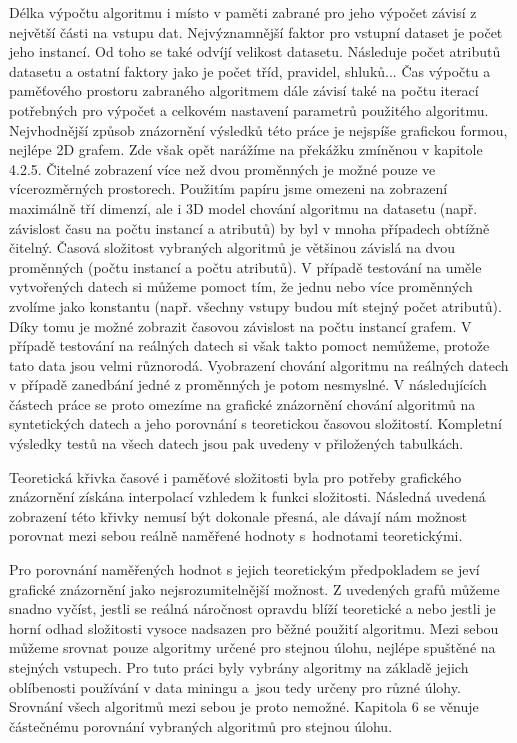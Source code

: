 \documentclass[12pt]{article}
\begin{document}
Délka výpočtu algoritmu i místo v paměti zabrané pro jeho výpočet závisí z největší části na vstupu dat. Nejvýznamnější faktor pro vstupní dataset je počet jeho instancí. Od toho se také odvíjí velikost datasetu. Následuje počet atributů datasetu a ostatní faktory jako je počet tříd, pravidel, shluků... Čas výpočtu a paměťového prostoru zabraného algoritmem dále závisí také na počtu iterací potřebných pro výpočet a celkovém nastavení parametrů použitého algoritmu.
\newline
\indent
Nejvhodnější způsob znázornění výsledků této práce je nejspíše grafickou formou, nejlépe 2D grafem. Zde však opět narážíme na překážku zmíněnou v kapitole 4.2.5. Čitelné zobrazení více než dvou proměnných je možné pouze ve vícerozměrných prostorech. Použitím papíru jsme omezeni na zobrazení maximálně tří dimenzí, ale i 3D model chování algoritmu na datasetu (např. závislost času na počtu instancí a atributů) by byl v mnoha případech obtížně čitelný. 
\newline
\indent
Časová složitost vybraných algoritmů je většinou závislá na dvou proměnných (počtu instancí a počtu atributů). V případě testování na uměle vytvořených datech si můžeme pomoct tím, že jednu nebo více proměnných zvolíme jako konstantu (např. všechny vstupy budou mít stejný počet atributů). Díky tomu je možné zobrazit časovou závislost na počtu instancí grafem. V případě testování na reálných datech si však takto pomoct nemůžeme, protože tato data jsou velmi různorodá. Vyobrazení chování algoritmu na reálných datech v případě zanedbání jedné z proměnných je potom nesmyslné. V následujících částech práce se proto omezíme na grafické znázornění chování algoritmů na syntetických datech a jeho porovnání s teoretickou časovou složitostí. Kompletní výsledky testů na všech datech jsou pak uvedeny v přiložených tabulkách.

Teoretická křivka časové i paměťové složitosti byla pro potřeby grafického znázornění získána interpolací vzhledem k funkci složitosti. Následná uvedená zobrazení této křivky nemusí být dokonale přesná, ale dávají nám možnost porovnat mezi sebou reálně naměřené hodnoty s~hodnotami teoretickými. 

Pro porovnání naměřených hodnot s jejich teoretickým předpokladem se jeví grafické znázornění jako nejsrozumitelnější možnost. Z uvedených grafů můžeme snadno vyčíst, jestli se reálná náročnost opravdu blíží teoretické a nebo jestli je horní odhad složitosti vysoce nadsazen pro běžné použití algoritmu. 
\newline
\indent
Mezi sebou můžeme srovnat pouze algoritmy určené pro stejnou úlohu, nejlépe spuštěné na stejných vstupech. Pro tuto práci byly vybrány algoritmy na základě jejich oblíbenosti používání v data miningu a~jsou tedy určeny pro různé úlohy. Srovnání všech algoritmů mezi sebou je proto nemožné. Kapitola 6 se věnuje částečnému porovnání vybraných algoritmů pro stejnou úlohu.
\end{document}
